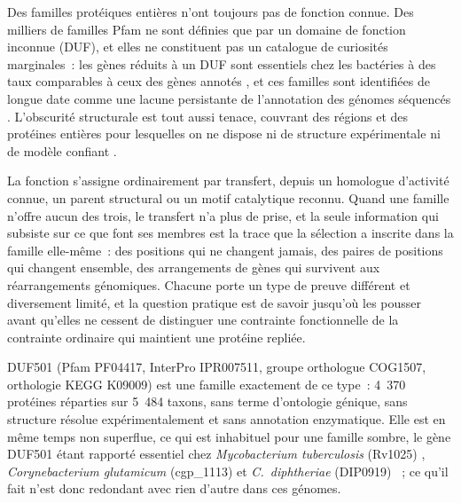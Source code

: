 \documentclass[11pt,a4paper]{article}
\newcommand{\mtb}{\textit{Mycobacterium tuberculosis}}
\begin{document}
Des familles protéiques entières n'ont toujours pas de fonction connue. Des milliers de familles Pfam ne sont définies que par un domaine de fonction inconnue (DUF), et elles ne constituent pas un catalogue de curiosités marginales~: les gènes réduits à un DUF sont essentiels chez les bactéries à des taux comparables à ceux des gènes annotés \citep{goodacre2014dufessential}, et ces familles sont identifiées de longue date comme une lacune persistante de l'annotation des génomes séquencés \citep{bateman2010dufs}. L'obscurité structurale est tout aussi tenace, couvrant des régions et des protéines entières pour lesquelles on ne dispose ni de structure expérimentale ni de modèle confiant \citep{perdigao2015darkproteome}.

La fonction s'assigne ordinairement par transfert, depuis un homologue d'activité connue, un parent structural ou un motif catalytique reconnu. Quand une famille n'offre aucun des trois, le transfert n'a plus de prise, et la seule information qui subsiste sur ce que font ses membres est la trace que la sélection a inscrite dans la famille elle-même~: des positions qui ne changent jamais, des paires de positions qui changent ensemble, des arrangements de gènes qui survivent aux réarrangements génomiques. Chacune porte un type de preuve différent et diversement limité, et la question pratique est de savoir jusqu'où les pousser avant qu'elles ne cessent de distinguer une contrainte fonctionnelle de la contrainte ordinaire qui maintient une protéine repliée.

DUF501 (Pfam PF04417, InterPro IPR007511, groupe orthologue COG1507, orthologie KEGG K09009) est une famille exactement de ce type~: 4~370 protéines réparties sur 5~484 taxons, sans terme d'ontologie génique, sans structure résolue expérimentalement et sans annotation enzymatique. Elle est en même temps non superflue, ce qui est inhabituel pour une famille sombre, le gène DUF501 étant rapporté essentiel chez \mtb{} (Rv1025) \citep{dejesus2017essentiality}, \textit{Corynebacterium glutamicum} (cgp\_1113) et \textit{C.\ diphtheriae} (DIP0919) \citep{goodall2023diphtheriae}~; ce qu'il fait n'est donc redondant avec rien d'autre dans ces génomes.
\end{document}
